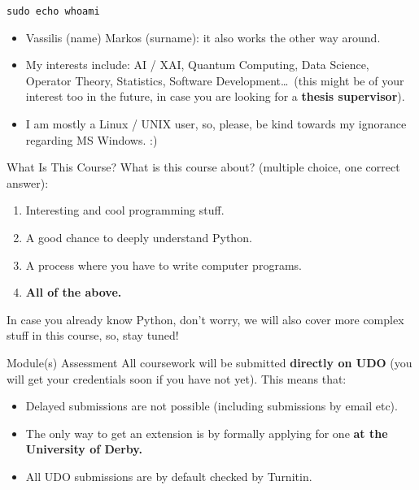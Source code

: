 \documentclass[aspectratio=169, 12pt, xcolor=table]{beamer}
\begin{document}
	\begin{frame}{\texttt{sudo echo whoami}}
		\begin{itemize}
			\item Vassilis (name) Markos (surname): it also works the other way around.
			\item My interests include: AI / XAI, Quantum Computing, Data Science, Operator Theory, Statistics, Software Development\ldots\ (this might be of your interest too in the future, in case you are looking for a \textbf{thesis supervisor}).
			\item I am mostly a Linux / UNIX user, so, please, be kind towards my ignorance regarding MS Windows. :)
		\end{itemize}
	\end{frame}

	\begin{frame}{What Is This Course?}
		What is this course about? (multiple choice, one correct answer):
		\renewcommand{\theenumi}{\alph{enumi}}
		\begin{enumerate}
			\item Interesting and cool programming stuff.
			\item A good chance to deeply understand Python.
			\item A process where you have to write computer programs.
			\item \textbf{All of the above.}
		\end{enumerate}
		In case you already know Python, don't worry, we will also cover more complex stuff in this course, so, stay tuned!
	\end{frame}

	\begin{headsup}{Module(s) Assessment}
		All coursework will be submitted \textbf{directly on UDO} (you will get your credentials soon if you have not yet). This means that:
		\begin{itemize}
			\item Delayed submissions are not possible (including submissions by email etc).
			\item The only way to get an extension is by formally applying for one \textbf{at the University of Derby.}
			\item All UDO submissions are by default checked by Turnitin.
		\end{itemize}
	\end{headsup}
\end{document}
